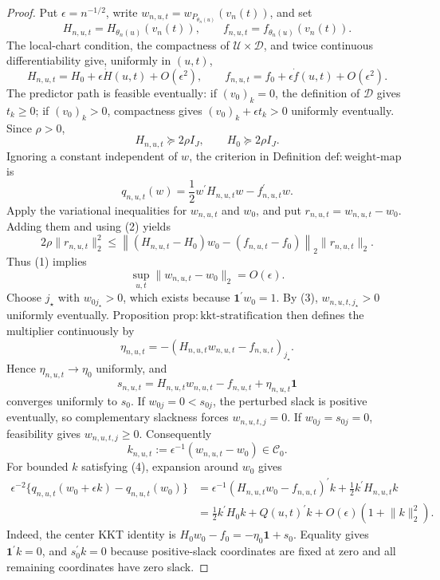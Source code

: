 \documentclass{article}
\begin{document}
\begin{proof}
Put \(\epsilon=n^{-1/2}\), write \(w_{n,u,t}=w_{P_{\theta_n(u)}}(v_n(t))\), and set
\[
 H_{n,u,t}=H_{\theta_n(u)}(v_n(t)),\qquad
 f_{n,u,t}=f_{\theta_n(u)}(v_n(t)).
\]
The local-chart condition, the compactness of \(\mathcal U\times\mathcal D\), and twice continuous differentiability give, uniformly in \((u,t)\),
\[
 H_{n,u,t}=H_0+\epsilon\dot H(u,t)+O(\epsilon^2),
 \qquad
 f_{n,u,t}=f_0+\epsilon\dot f(u,t)+O(\epsilon^2).
\tag{1}
\]
The predictor path is feasible eventually: if \((v_0)_k=0\), the definition of \(\mathcal D\) gives \(t_k\geq0\); if \((v_0)_k>0\), compactness gives \((v_0)_k+\epsilon t_k>0\) uniformly eventually.  Since \(\rho>0\),
\[
 H_{n,u,t}\succeq 2\rho I_J,\qquad H_0\succeq2\rho I_J.
\tag{2}
\]
Ignoring a constant independent of \(w\), the criterion in Definition \(\mathrm{def:weight\mbox{-}map}\) is
\[
 q_{n,u,t}(w)=\frac12w^\prime H_{n,u,t}w-f_{n,u,t}^\prime w.
\]
Apply the variational inequalities for \(w_{n,u,t}\) and \(w_0\), and put \(r_{n,u,t}=w_{n,u,t}-w_0\).  Adding them and using (2) yields
\[
 2\rho\lVert r_{n,u,t}\rVert_2^2
 \leq
 \left\lVert (H_{n,u,t}-H_0)w_0-(f_{n,u,t}-f_0)\right\rVert_2
 \lVert r_{n,u,t}\rVert_2.
\]
Thus (1) implies
\[
 \sup_{u,t}\lVert w_{n,u,t}-w_0\rVert_2=O(\epsilon).
\tag{3}
\]
Choose \(j_\star\) with \(w_{0j_\star}>0\), which exists because \(\mathbf1^\prime w_0=1\).  By (3), \(w_{n,u,t,j_\star}>0\) uniformly eventually.  Proposition \(\mathrm{prop:kkt\mbox{-}stratification}\) then defines the multiplier continuously by
\[
 \eta_{n,u,t}=-(H_{n,u,t}w_{n,u,t}-f_{n,u,t})_{j_\star}.
\]
Hence \(\eta_{n,u,t}\to\eta_0\) uniformly, and
\[
 s_{n,u,t}=H_{n,u,t}w_{n,u,t}-f_{n,u,t}+\eta_{n,u,t}\mathbf1
\]
converges uniformly to \(s_0\).  If \(w_{0j}=0<s_{0j}\), the perturbed slack is positive eventually, so complementary slackness forces \(w_{n,u,t,j}=0\).  If \(w_{0j}=s_{0j}=0\), feasibility gives \(w_{n,u,t,j}\geq0\).  Consequently
\[
 k_{n,u,t}:=\epsilon^{-1}(w_{n,u,t}-w_0)\in\mathcal C_0.
\tag{4}
\]
For bounded \(k\) satisfying (4), expansion around \(w_0\) gives
\[
\begin{aligned}
 \epsilon^{-2}\{q_{n,u,t}(w_0+\epsilon k)-q_{n,u,t}(w_0)\}
 &=
 \epsilon^{-1}(H_{n,u,t}w_0-f_{n,u,t})^\prime k
 +\frac12k^\prime H_{n,u,t}k\\
 &=
 \frac12k^\prime H_0k+Q(u,t)^\prime k
 +O(\epsilon)(1+\lVert k\rVert_2^2).
\end{aligned}
\tag{5}
\]
Indeed, the center KKT identity is \(H_0w_0-f_0=-\eta_0\mathbf1+s_0\).  Equality gives \(\mathbf1^\prime k=0\), and \(s_0^\prime k=0\) because positive-slack coordinates are fixed at zero and all remaining coordinates have zero slack.


\end{proof}
\end{document}
